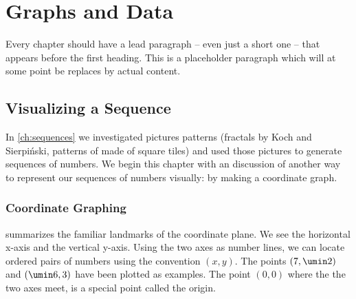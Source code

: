 \chapter{Graphs and Data}
\label{ch:graphs}


Every chapter should have a lead paragraph -- even just a short one -- that appears before the first heading. This is a placeholder paragraph which will at some point be replaces by actual content.


\section{Visualizing a Sequence}
\label{sec:vizsequence}

In \cref{ch:sequences} we investigated pictures patterns (fractals by Koch and Sierpi\'nski, patterns of made of square tiles) and used those pictures to generate sequences of numbers. We begin this chapter with an discussion of another way to represent our sequences of numbers visually: by making a coordinate graph.

\subsection{Coordinate Graphing}

 summarizes the familiar landmarks of the \gls{coordinate plane}. We see the horizontal \gls{x-axis} and the vertical \gls{y-axis}. Using the two axes as number lines, we can locate \glspl{ordered pair} of numbers using the convention $(x,y)$. The points $(7, \umin2)$ and $(\umin6, 3)$ have been plotted as examples. The point $(0,0)$ where the the two axes meet, is a special point called the \gls{origin}.

